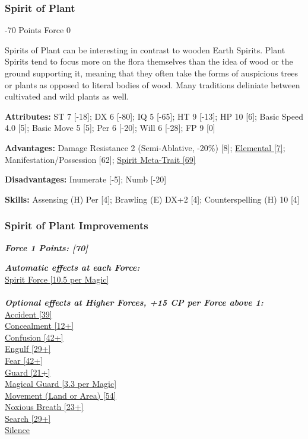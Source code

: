 \begin{multicols}{3}
	\subsubsection{Spirit of Plant}
	\begin{flushright}
		-70 Points Force 0
	\end{flushright} 
	
	Spirits of Plant can be interesting in contrast to wooden Earth Spirits. Plant Spirits tend to focus more on the flora themselves than the idea of wood or the ground supporting it, meaning that they often take the forms of auspicious trees or plants as opposed to literal bodies of wood. Many traditions deliniate between cultivated and wild plants as well.
	
	\textbf{Attributes:}
	ST 7 [-18]; DX 6 [-80]; IQ 5 [-65]; HT 9 [-13]; HP 10 [6]; Basic Speed 4.0 [5]; Basic Move 5 [5]; Per 6 [-20]; Will 6 [-28]; FP 9 [0]
	
	\textbf{Advantages:}
	Damage Resistance 2 (Semi-Ablative, -20\%) [8]; \hyperref[elemental]{Elemental [7]}; Manifestation/Possession [62]; \hyperref[spirit_meta_trait]{Spirit Meta-Trait [69]}
	
	\textbf{Disadvantages:}
	Inumerate [-5]; Numb [-20]
	
	\textbf{Skills:}
	Assensing (H) Per [4]; Brawling (E) DX+2 [4]; Counterspelling (H) 10 [4]
	
	\subsubsection*{Spirit of Plant Improvements}
	
	\textbf{\textit{Force 1 Points: [70]}}
	
	\textbf{\textit{Automatic effects at each Force:\\}}
	\hyperref[spirit_force]{Spirit Force [10.5 per Magic]}\\\\
	
	\textbf{\textit{Optional effects at Higher Forces, +15 CP per Force above 1:\\}}
	\hyperref[accident]{Accident [39]}\\
	\hyperref[concealment]{Concealment [12+]}\\
	\hyperref[confusion]{Confusion [42+]}\\
	\hyperref[engulf]{Engulf [29+]}\\
	\hyperref[fear]{Fear [42+]}\\
	\hyperref[guard]{Guard [21+]}\\
	\hyperref[magical_guard]{Magical Guard [3.3 per Magic]}\\
	\hyperref[movement]{Movement (Land or Area) [54]}\\
	\hyperref[noxious_breath]{Noxious Breath [23+]}\\
	\hyperref[search]{Search [29+]}\\
	\hyperref[silence]{Silence}\\
	

\end{multicols}
